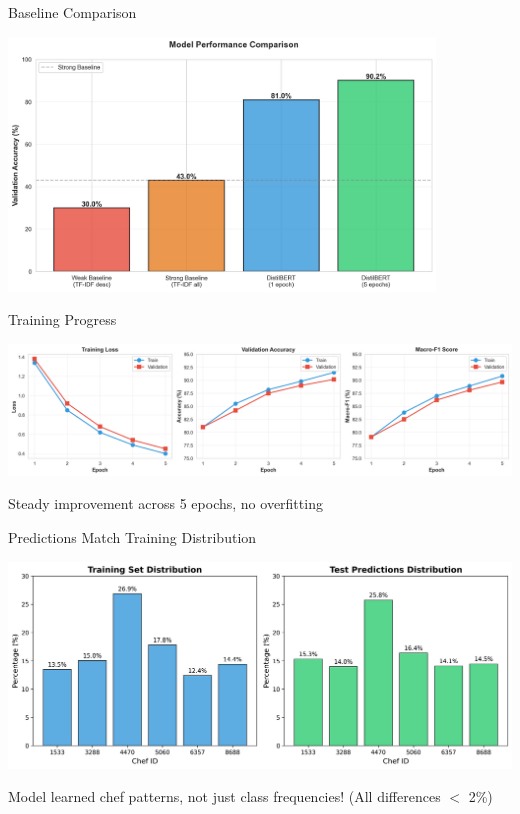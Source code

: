 \documentclass{beamer}
\begin{document}
\begin{frame}{Baseline Comparison}
\begin{center}
\includegraphics[width=0.85\textwidth]{../results/figures/baseline_comparison.png}
\end{center}
\end{frame}

\begin{frame}{Training Progress}
\begin{center}
\includegraphics[width=\textwidth]{../results/figures/training_curves.png}
\end{center}
Steady improvement across 5 epochs, no overfitting
\end{frame}

\begin{frame}{Predictions Match Training Distribution}
\begin{center}
\includegraphics[width=\textwidth]{../results/figures/distribution_comparison.png}
\end{center}
\small Model learned chef patterns, not just class frequencies! (All differences $<$ 2\%)
\end{frame}
\end{document}
